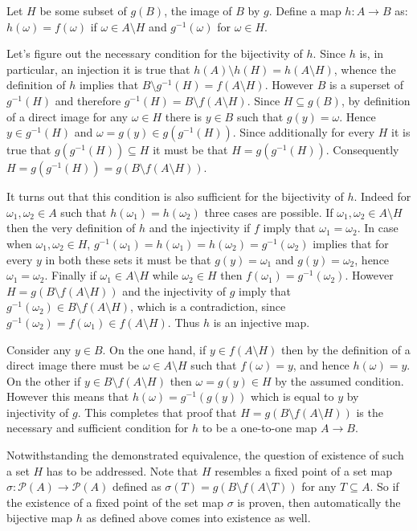 \documentclass[a4paper]{article}
\newcommand{\brac}[1]{{\left({#1}\right)}}
\begin{document}
Let $H$ be some subset of $g(B)$, the image of $B$ by $g$. Define a map $h:A\to B$ as: $h(\omega) = f(\omega)$ if $\omega\in A\setminus H$ and $g^{-1}(\omega)$ for $\omega\in H$.

Let's figure out the necessary condition for the bijectivity of $h$. Since $h$ is, in particular, an injection it is true that $h(A)\setminus h(H) = h(A\setminus H)$, whence the definition of $h$ implies that $B\setminus g^{-1}(H) = f(A\setminus H)$. However $B$ is a superset of $g^{-1}(H)$ and therefore $g^{-1}(H) = B\setminus f(A\setminus H)$. Since $H\subseteq g(B)$, by definition of a direct image for any $\omega\in H$ there is $y\in B$ such that $g(y)=\omega$. Hence $y\in g^{-1}(H)$ and $\omega=g(y)\in g(g^{-1}(H))$. Since additionally for every $H$ it is true that $g(g^{-1}(H)) \subseteq H$ it must be that $H=g(g^{-1}(H))$. Consequently $H=g(g^{-1}(H))=g(B\setminus f(A\setminus H))$.

It turns out that this condition is also sufficient for the bijectivity of $h$. Indeed for $\omega_1, \omega_2\in A$ such that $h(\omega_1)=h(\omega_2)$ three cases are possible. If $\omega_1, \omega_2\in A\setminus H$ then the very definition of $h$ and the injectivity if $f$ imply that $\omega_1=\omega_2$.
In case when $\omega_1, \omega_2\in H$, $g^{-1}(\omega_1)=h(\omega_1)=h(\omega_2)=g^{-1}(\omega_2)$ implies that for every $y$ in both these sets it must be that $g(y)=\omega_1$ and $g(y)=\omega_2$, hence $\omega_1=\omega_2$.
Finally if $\omega_1\in A\setminus H$ while $\omega_2\in H$ then $f(\omega_1)=g^{-1}(\omega_2)$. However $H=g(B\setminus f(A\setminus H))$ and the injectivity of $g$ imply that $g^{-1}(\omega_2)\in B\setminus f(A\setminus H)$, which is a contradiction, since $g^{-1}(\omega_2)=f(\omega_1)\in f(A\setminus H)$. Thus $h$ is an injective map.

Consider any $y\in B$. On the one hand, if $y\in f(A\setminus H)$ then by the definition of a direct image there must be $\omega\in A\setminus H$ such that $f(\omega)=y$, and hence $h(\omega)=y$. On the other if $y\in B\setminus f(A\setminus H)$ then $\omega=g(y)\in H$ by the assumed condition. However this means that $h(\omega)=g^{-1}(g(y))$ which is equal to $y$ by injectivity of $g$. This completes that proof that $H=g(B\setminus f(A\setminus H))$ is the necessary and sufficient condition for $h$ to be a one-to-one map $A\to B$.

Notwithstanding the demonstrated equivalence, the question of existence of such a set $H$ has to be addressed. Note that $H$ resembles a fixed point of a set map $\sigma:\mathcal{P}\brac{A}\to \mathcal{P}\brac{A}$ defined as $\sigma(T)=g(B\setminus f(A\setminus T))$ for any $T\subseteq A$. So if the existence of a fixed point of the set map $\sigma$ is proven, then automatically the bijective map $h$ as defined above comes into existence as well.
\end{document}
